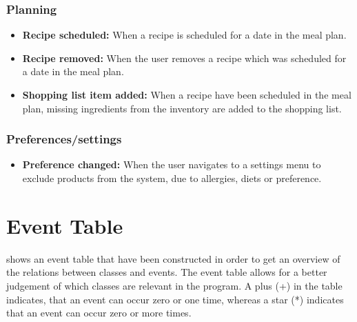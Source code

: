 \subsubsection{Planning}
\begin{itemize}
    \item \textbf{Recipe scheduled:} When a recipe is scheduled for a date in the meal plan.
    \item \textbf{Recipe removed:} When the user removes a recipe which was scheduled for a date in the meal plan.
    \item \textbf{Shopping list item added:} When a recipe have been scheduled in the meal plan, missing ingredients from the inventory are added to the shopping list.
\end{itemize}

\subsubsection{Preferences/settings}
\begin{itemize}
\item \textbf{Preference changed:} When the user navigates to a settings menu to exclude products from the system, due to allergies, diets or preference.
\end{itemize}

\section{Event Table}
 shows an event table that have been constructed in order to get an overview of the relations between classes and events. The event table allows for a better judgement of which classes are relevant in the program. A plus (+) in the table indicates, that an event can occur zero or one time, whereas a star (*) indicates that an event can occur zero or more times.

